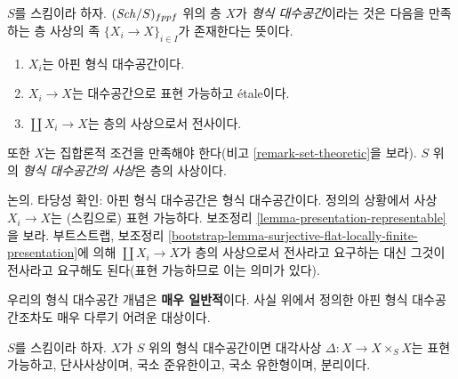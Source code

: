 \begin{definition}
\label{definition-formal-algebraic-space}
$S$를 스킴이라 하자. $(\mathit{Sch}/S)_{fppf}$ 위의 층 $X$가
{\it 형식 대수공간}이라는 것은 다음을 만족하는 층 사상의 족
$\{X_i \to X\}_{i \in I}$가 존재한다는 뜻이다.
\begin{enumerate}
\item $X_i$는 아핀 형식 대수공간이다.
\item $X_i \to X$는 대수공간으로 표현 가능하고 \'etale이다.
\item $\coprod X_i \to X$는 층의 사상으로서 전사이다.
\end{enumerate}
또한 $X$는 집합론적 조건을 만족해야 한다(비고
\ref{remark-set-theoretic}을 보라). $S$ 위의
{\it 형식 대수공간의 사상}은 층의 사상이다.
\end{definition}

\noindent
논의. 타당성 확인: 아핀 형식 대수공간은 형식 대수공간이다.
정의의 상황에서 사상 $X_i \to X$는 (스킴으로) 표현 가능하다.
보조정리 \ref{lemma-presentation-representable}을 보라.
부트스트랩, 보조정리
\ref{bootstrap-lemma-surjective-flat-locally-finite-presentation}에
의해 $\coprod X_i \to X$가 층의 사상으로서 전사라고 요구하는 대신
그것이 전사라고 요구해도 된다(표현 가능하므로 이는 의미가 있다).

\medskip\noindent
우리의 형식 대수공간 개념은 {\bf 매우 일반적}이다. 사실 위에서
정의한 아핀 형식 대수공간조차도 매우 다루기 어려운 대상이다.

\begin{lemma}
\label{lemma-diagonal-formal-algebraic-space}
$S$를 스킴이라 하자. $X$가 $S$ 위의 형식 대수공간이면 대각사상
$\Delta : X \to X \times_S X$는 표현 가능하고, 단사사상이며,
국소 준유한이고, 국소 유한형이며, 분리이다.
\end{lemma}

